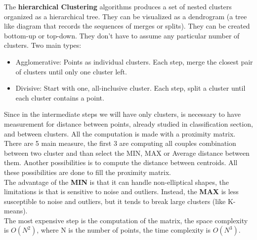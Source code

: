 \documentclass[12pt]{article}
\begin{document}
The \textbf{hierarchical Clustering} algorithms produces a set of nested clusters organized as a hierarchical tree. They can be visualized as a dendrogram (a tree like diagram that records the sequences of merges or splits). They can be created bottom-up or top-down. They don't have to assume any particular number of clusters. Two main types:
\begin{itemize}
  \item Agglomerative: Points as individual clusters. Each step, merge the closest pair of clusters until only one cluster left.
  \item Divisive: Start with one, all-inclusive cluster. Each step, split a cluster until each cluster contains a point.
\end{itemize}
Since in the intermediate steps we will have only clusters, is necessary to have measurement for distance between points, already studied in classification section, and between clusters. All the computation is made with a proximity matrix.\\
There are 5 main measure, the first 3 are computing all couples combination between two cluster and than select the MIN, MAX or Average distance between them. Another possibilities is to compute the distance between centroids.  All these possibilities are done to fill the proximity matrix.\\
The advantage of the \textbf{MIN} is that it can handle non-elliptical shapes, the limitations is that is sensitive to noise and outliers. Instead, the \textbf{MAX} is less susceptible to noise and outliers, but it tends to break large clusters (like K-means).\\
The most expensive step is the computation of the matrix, the space complexity is $O(N^2)$, where N is the number of points, the time complexity is $O(N^3)$.\\
\end{document}
